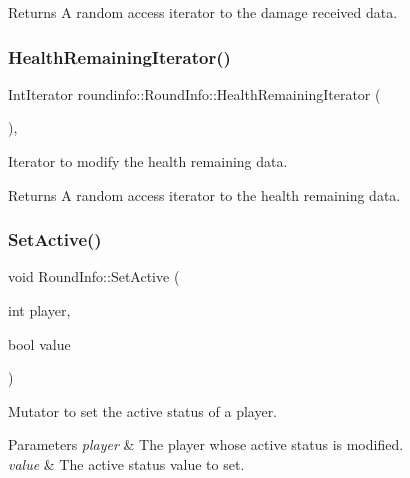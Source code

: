 \begin{DoxyReturn}{Returns}
A random access iterator to the damage received data. 
\end{DoxyReturn}
\mbox{\label{classroundinfo_1_1_round_info_a3a81f2d87bea27339f035201f1887423}} 
\subsubsection{\texorpdfstring{Health\+Remaining\+Iterator()}{HealthRemainingIterator()}}
{\footnotesize\ttfamily Int\+Iterator roundinfo\+::\+Round\+Info\+::\+Health\+Remaining\+Iterator (\begin{DoxyParamCaption}{ }\end{DoxyParamCaption})\hspace{0.3cm}{\ttfamily [inline]}, {\ttfamily [noexcept]}}



Iterator to modify the health remaining data. 

\begin{DoxyReturn}{Returns}
A random access iterator to the health remaining data. 
\end{DoxyReturn}
\mbox{\label{classroundinfo_1_1_round_info_a28d85479753dae18a6b2a27d048d2973}} 
\subsubsection{\texorpdfstring{Set\+Active()}{SetActive()}}
{\footnotesize\ttfamily void Round\+Info\+::\+Set\+Active (\begin{DoxyParamCaption}\item[{int}]{player,  }\item[{bool}]{value }\end{DoxyParamCaption})}



Mutator to set the active status of a player. 


\begin{DoxyParams}{Parameters}
{\em player} & The player whose active status is modified. \\
\hline
{\em value} & The active status value to set. \\
\hline
\end{DoxyParams}

